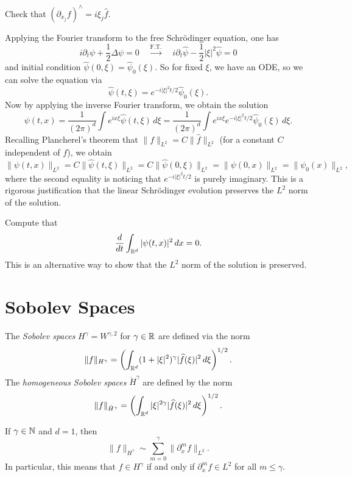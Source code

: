 \begin{exercise}
  Check that $(\partial_{x_j} f)^\wedge = i \xi_j \widehat{f}$.
\end{exercise}

Applying the Fourier transform to the free Schr\"odinger
equation, one has
\[
  i \partial_t \psi + \frac{1}{2} \Delta \psi = 0 \quad
  \xrightarrow{\text{F.T.}} \quad
  i \partial_t \widehat{\psi} - \frac{1}{2} |\xi|^2 \widehat{\psi} = 0
\]
and initial condition $\widehat{\psi}(0, \xi) = \widehat{\psi}_0(\xi)$.
So for fixed $\xi$, we have an ODE, so we
can solve the equation via
\[
  \widehat{\psi}(t, \xi) =
  e^{-i |\xi|^2 t / 2} \widehat{\psi}_0(\xi).
\]
Now by applying the inverse Fourier transform, we obtain
the solution
\[
  \psi(t, x) = \frac{1}{(2\pi)^d} \int e^{ix\xi} \widehat{\psi}(t, \xi)\, d\xi
  = \frac{1}{(2\pi)^d} \int e^{ix\xi} e^{-i |\xi|^2 t / 2} \widehat{\psi}_0(\xi)\, d\xi.
\]
Recalling Plancherel's theorem that
$\|f\|_{L^2} = C\|\widehat{f}\|_{L^2}$ (for a constant
$C$ independent of $f$), we obtain
\[
  \|\psi(t, x)\|_{L^2}
  = C\|\widehat{\psi}(t, \xi)\|_{L^2}
  = C\|\widehat{\psi}(0, \xi)\|_{L^2}
  = \|\psi(0, x)\|_{L^2}
  = \|\psi_0(x)\|_{L^2},
\]
where the second equality is noticing that
$e^{-i |\xi|^2 t / 2}$ is purely imaginary. This is
a rigorous justification that the linear Schr\"odinger
evolution preserves the $L^2$ norm of the solution.

\begin{exercise}
  Compute that
  \[
    \frac{d}{dt} \int_{\mathbb{R}^d} |\psi(t, x)|^2\, dx = 0.
  \]
  This is an alternative way to show that
  the $L^2$ norm of the solution is preserved.
\end{exercise}

\section{Sobolev Spaces}
\begin{definition}
  The \emph{Sobolev spaces} $H^{\gamma} = W^{\gamma, 2}$
  for $\gamma \in \mathbb{R}$
  are defined via the norm
  \[
    \|f\|_{H^{\gamma}}
    = \left(\int_{\mathbb{R}^d} (1 + |\xi|^2)^\gamma |\widehat{f}(\xi)|^2\, d\xi\right)^{1 / 2}.
  \]
  The \emph{homogeneous Sobolev spaces} $\dot{H}^\gamma$
  are defined by the norm
  \[
    \|f\|_{\dot{H}^\gamma}
    = \left(\int_{\mathbb{R}^d} |\xi|^{2\gamma} |\widehat{f}(\xi)|^2\, d\xi\right)^{1 / 2}.
  \]
\end{definition}

\begin{remark}
  If $\gamma \in \mathbb{N}$ and $d = 1$, then
  \[
    \|f\|_{H^{\gamma}}
    \sim \sum_{m = 0}^\gamma \| \partial_x^m f \|_{L^2}.
  \]
  In particular, this means that
  $f \in H^\gamma$ if and only if
  $\partial_x^m f \in L^2$ for all $m \le \gamma$.
\end{remark}

